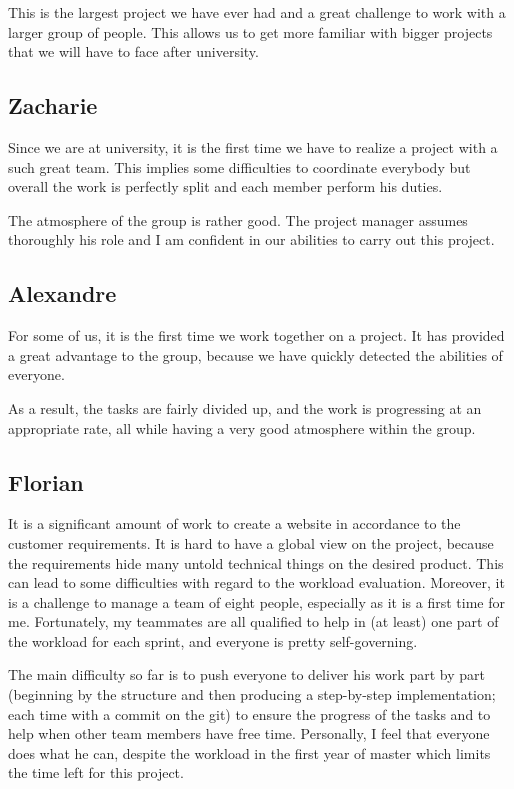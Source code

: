 This is the largest project we have ever had and a great challenge to work
with a larger group of people. This allows us to get more familiar with
bigger projects that we will have to face after university.

\subsection{Zacharie}

Since we are at university, it is the first time we have to realize a
project with a such great team. This implies some difficulties to
coordinate everybody but overall the work is perfectly split and each
member perform his duties. \newline

The atmosphere of the group is rather good. The project manager assumes
thoroughly his role and I am confident in our abilities to carry out this
project.

\subsection{Alexandre}

For some of us, it is the first time we work together on a project. It has
provided a great advantage to the group, because we have quickly detected
the abilities of everyone. \newline

As a result, the tasks are fairly divided up, and the work is progressing
at an appropriate rate, all while having a very good atmosphere within the
group.

\subsection{Florian}

It is a significant amount of work to create a website in accordance to the
customer requirements. It is hard to have a global view on the project,
because the requirements hide many untold technical things on the desired
product. This can lead to some difficulties with regard to the workload
evaluation. Moreover, it is a challenge to manage a team of eight people,
especially as it is a first time for me. Fortunately, my
teammates are all qualified to help in (at least) one part of the workload for
each sprint, and everyone is pretty self-governing. \newline

The main difficulty so far is to push everyone to deliver his work part by
part (beginning by the structure and then producing a step-by-step
implementation; each time with a commit on the git) to ensure the progress
of the tasks and to help when other team members have free time.
Personally, I feel that everyone does what he can, despite the workload in
the first year of master which limits the time left for this project.\newline
